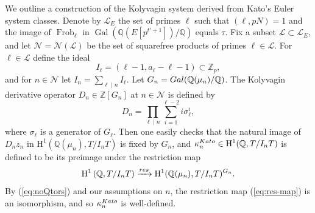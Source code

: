 \documentclass[10pt,reqno]{amsart}
\numberwithin{equation}{section}
\theoremstyle{plain}
\theoremstyle{definition}
\newtheorem{defi}[thm]{Definition}
\theoremstyle{definition}
\theoremstyle{plain}
\theoremstyle{plain}
\theoremstyle{plain}
\theoremstyle{plain}
\theoremstyle{plain}
\theoremstyle{plain}
\newcommand{\Gal}{\operatorname{Gal}}
\newcommand{\Z}{\mathbb{Z}}
\newcommand{\Q}{\mathbb{Q}}
\DeclareMathOperator{\frob}{Frob}
\newcommand{\cL}{\mathcal{L}}
\newcommand{\rH}{\mathrm{H}}
\begin{document}
We outline a construction of the Kolyvagin system derived from Kato's Euler system classes. 
{Denote by $\mathcal{L}_E$ the set of primes $\ell$ such that $(\ell,pN)=1$ and the image of $\frob_\ell$ in $\Gal(\Q(E[p^{t'+1}])/\Q)$ equals $\tau$.
}
Fix a subset $\mathcal{\cL}\subset\mathcal{L}_E$, and let $\mathcal{N}=\mathcal{N}(\cL)$ be the set of squarefree products of primes $\ell\in\mathcal{L}$. 
For $\ell\in\mathcal{L}$ define the ideal
\begin{equation}\label{eq:I-ell}
I_{\ell}=(\ell-1,a_\ell-\ell-1)\subset \Z_p,
\end{equation}
and for $n\in\mathcal{N}$ let $I_n=\sum_{\ell\mid n}I_\ell$. Let $G_n={\rm Gal}(\Q(\mu_n)/\Q)$. The Kolyvagin derivative operator $D_n\in\Z[G_n]$ at $n\in\mathcal{N}$ is defined by 
\[
D_{n}=\prod_{\ell \mid n}\sum_{i=1}^{\ell-2} i \sigma_{\ell}^i,
\] 
where $\sigma_{\ell}$ is a generator of $G_\ell$. Then one easily checks that the natural image of $D_nz_n$ in $\rH^1(\Q(\mu_n),T/I_nT)$ is fixed by $G_n$, and $\kappa_n^{\rm Kato}\in\rH^1(\Q,T/I_nT)$ is defined to be its preimage under the restriction map 
\begin{equation}\label{eq:res-map}
\rH^1\left(\Q, T / I_n T\right) \xrightarrow{\rm res}  \rH^1(\Q(\mu_n), T/I_nT)^{G_n}.
\end{equation}
By (\ref{eq:noQtors}) and our assumptions on $n$, the restriction map 
(\ref{eq:res-map}) is an isomorphism, and so $\kappa_n^{\rm Kato}$ is well-defined.
%
%
\end{document}

